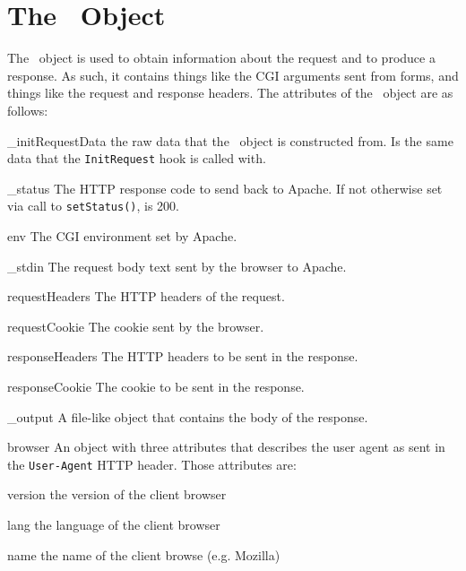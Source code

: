 \documentclass{manual}
\begin{document}
\section{The \connection\  Object}
The \connection\ object is used to obtain information about the
request and to produce a response.  As such, it contains things like
the CGI arguments sent from forms, and things like the request and
response headers.  The attributes of the \connection\ object are as
follows:

\begin{memberdesc}[dictionary]{\_initRequestData}
 the raw data that the \connection\ object is
constructed from.  Is the same data that the \texttt{InitRequest} hook
is called with.
\end{memberdesc}
\begin{memberdesc}[integer]{\_status}
 The HTTP response code to send back to Apache.  If not
otherwise set via call to \texttt{setStatus()}, is 200.
\end{memberdesc}
\begin{memberdesc}[dictionary]{env}
 The CGI environment set by Apache.
\end{memberdesc}
\begin{memberdesc}[string]{\_stdin}
The request body text sent by the browser to Apache.
\end{memberdesc}
\begin{memberdesc}[HeaderDict]{requestHeaders} The HTTP headers of the request.
\end{memberdesc}
\begin{memberdesc}[Cookie]{requestCookie} The cookie sent by the browser.
\end{memberdesc}
\begin{memberdesc}[HeaderDict]{responseHeaders} The HTTP headers to be
sent in the response. 
\end{memberdesc}
\begin{memberdesc}[Cookie]{responseCookie} The cookie to be sent in
the response.
\end{memberdesc}
\begin{memberdesc}[File]{\_output} A file-like object that contains
the body of the response. 
\end{memberdesc}
\begin{memberdesc}[Browser]{browser} An object with three attributes
that describes the user agent as sent in the \texttt{User-Agent} HTTP header.  Those attributes are:

\begin{memberdesc}[string]{version} the version of the client browser
\end{memberdesc}
\begin{memberdesc}[string]{lang} the language of the client browser
\end{memberdesc}
\begin{memberdesc}[string]{name} the name of the client browse (e.g. Mozilla)
\end{memberdesc}
\end{memberdesc}
\end{document}
